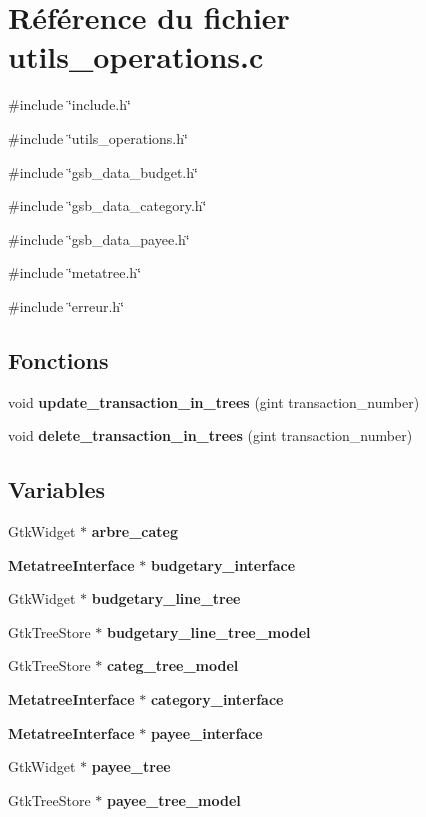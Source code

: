 \section{Référence du fichier utils\_\-operations.c}
\label{utils__operations_8c}
{\ttfamily \#include \char`\"{}include.h\char`\"{}}\par
{\ttfamily \#include \char`\"{}utils\_\-operations.h\char`\"{}}\par
{\ttfamily \#include \char`\"{}gsb\_\-data\_\-budget.h\char`\"{}}\par
{\ttfamily \#include \char`\"{}gsb\_\-data\_\-category.h\char`\"{}}\par
{\ttfamily \#include \char`\"{}gsb\_\-data\_\-payee.h\char`\"{}}\par
{\ttfamily \#include \char`\"{}metatree.h\char`\"{}}\par
{\ttfamily \#include \char`\"{}erreur.h\char`\"{}}\par
\subsection*{Fonctions}
\begin{DoxyCompactItemize}
\item 
void {\bf update\_\-transaction\_\-in\_\-trees} (gint transaction\_\-number)
\item 
void {\bf delete\_\-transaction\_\-in\_\-trees} (gint transaction\_\-number)
\end{DoxyCompactItemize}
\subsection*{Variables}
\begin{DoxyCompactItemize}
\item 
GtkWidget $\ast$ {\bf arbre\_\-categ}
\item 
{\bf MetatreeInterface} $\ast$ {\bf budgetary\_\-interface}
\item 
GtkWidget $\ast$ {\bf budgetary\_\-line\_\-tree}
\item 
GtkTreeStore $\ast$ {\bf budgetary\_\-line\_\-tree\_\-model}
\item 
GtkTreeStore $\ast$ {\bf categ\_\-tree\_\-model}
\item 
{\bf MetatreeInterface} $\ast$ {\bf category\_\-interface}
\item 
{\bf MetatreeInterface} $\ast$ {\bf payee\_\-interface}
\item 
GtkWidget $\ast$ {\bf payee\_\-tree}
\item 
GtkTreeStore $\ast$ {\bf payee\_\-tree\_\-model}
\end{DoxyCompactItemize}


